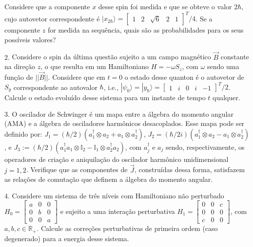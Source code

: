 \documentclass[11pt]{article}
\begin{document}
Considere que a componente \(x\) desse spin foi medida e que se obteve o
valor \(2\hbar\), cujo autovetor correspondente é
\(|x_{2\hbar}\rangle=\begin{bmatrix} 1 & 2 & \sqrt{6} & 2 & 1 \end{bmatrix}^{T}/4\).
Se a componente \(z\) for medida na sequência, quais são as
probabilidades para os seus possíveis valores?

    \(2.\) Considere o spin da última questão sujeito a um campo magnético
\(\vec{B}\) constante na direção \(z\), o que resulta em um Hamiltoniano
\(H=-\omega S_{z}\), com \(\omega\) sendo uma função de \(||\vec{B}||\).
Considere que em \(t=0\) o estado desse quanton é o autovetor de
\(S_{y}\) correspondente ao autovalor \(\hbar\), i.e.,
\(|\psi_{0}\rangle=|y_{\hbar}\rangle=\begin{bmatrix} 1 & i & 0 & i & -1 \end{bmatrix}^{T}/2\).
Calcule o estado evoluído desse sistema para um instante de tempo \(t\)
qualquer.

    \(3.\) O oscilador de Schwinger é um mapa entre a álgebra do momento
angular (AMA) e a álgebra de osciladores harmônicos desacoplados. Esse
mapa pode ser definido por:
\(J_{1}= (\hbar/2)(a_{1}^{\dagger}\otimes a_{2}+a_{1}\otimes a_{2}^{\dagger})\),
\(J_{2}= (\hbar/2i)(a_{1}^{\dagger}\otimes a_{2}-a_{1}\otimes a_{2}^{\dagger})\),
e
\(J_{3} := (\hbar/2)(a_{1}^{\dagger}a_{1}\otimes\mathbb{I}_{2} - \mathbb{I}_{1}\otimes a_{2}^{\dagger}a_{2})\),
com \(a_{j}^{\dagger}\) e \(a_{j}\) sendo, respectivamente, os
operadores de criação e aniquilação do oscilador harmônico
unidimensional \(j=1,2\). Verifique que as componentes de \(\vec{J}\),
construídas dessa forma, satisfazem as relações de comutação que definem
a álgebra do momento angular.

    \(4.\) Considere um sistema de três níveis com Hamiltoniano não
perturbado
\(H_{0} = \begin{bmatrix} a & 0 & 0 \\ 0 & b & 0 \\ 0 & 0 & a \end{bmatrix}\)
e sujeito a uma interação perturbativa
\(H_{1} = \begin{bmatrix} 0 & 0 & c \\ 0 & 0 & 0 \\ c & 0 & 0 \end{bmatrix}\),
com \(a,b,c\in\mathbb{R}_{+}\). Calcule as correções perturbativas de
primeira ordem (caso degenerado) para a energia desse sistema.


    
    
    
    
\end{document}
